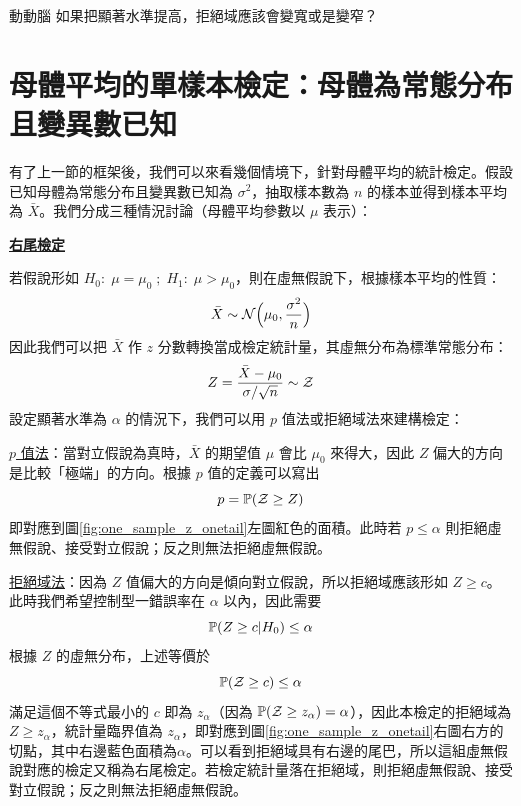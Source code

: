     \begin{custom}{動動腦}
       如果把顯著水準提高，拒絕域應該會變寬或是變窄？
    \end{custom}

    \answerbox{120pt}

\section{母體平均的單樣本檢定：母體為常態分布且變異數已知}
    有了上一節的框架後，我們可以來看幾個情境下，針對母體平均的統計檢定。假設已知母體為常態分布且變異數已知為 $\sigma^2$，抽取樣本數為 $n$ 的樣本並得到樣本平均為 $\bar{X}$。我們分成三種情況討論（母體平均參數以 $\mu$ 表示）：

    \medskip

    \noindent\underline{\textbf{右尾檢定}}

    若假說形如 $H_0: \; \mu = \mu_0 \; ; \; H_1: \; \mu > \mu_0$，則在虛無假說下，根據樣本平均的性質：
    \smallskip
    \[\bar{X} \sim \mathcal{N}\Big(\mu_0, \frac{\sigma^2}{n}\Big)\]
    \smallskip
    因此我們可以把 $\bar{X}$ 作 $z$ 分數轉換當成檢定統計量，其虛無分布為標準常態分布：
    \smallskip
    \[Z = \frac{\bar{X}-\mu_0}{\sigma/\sqrt{n}} \sim \mathcal{Z}\]
    \smallskip
    設定顯著水準為 $\alpha$ 的情況下，我們可以用 $p$ 值法或拒絕域法來建構檢定：

    \noindent \underline{$p$ 值法}：當對立假說為真時，$\bar{X}$ 的期望值 $\mu$ 會比 $\mu_0$ 來得大，因此 $Z$ 偏大的方向是比較「極端」的方向。根據 $p$ 值的定義可以寫出
    \smallskip
    \[p = \mathbb{P}(\mathcal{Z} \ge Z)\]
    \smallskip
    即對應到圖\ref{fig:one_sample_z_onetail}左圖紅色的面積。此時若 $p \le \alpha$ 則拒絕虛無假說、接受對立假說；反之則無法拒絕虛無假說。
    
    \noindent \underline{拒絕域法}：因為 $Z$ 值偏大的方向是傾向對立假說，所以拒絕域應該形如 $Z \ge c$。此時我們希望控制型一錯誤率在 $\alpha$ 以內，因此需要
    \smallskip
    \[\mathbb{P}(Z \ge c|H_0) \le \alpha\]
    \smallskip
    根據 $Z$ 的虛無分布，上述等價於
    \smallskip
    \[\mathbb{P}(\mathcal{Z} \ge c) \le \alpha\]
    \smallskip
    滿足這個不等式最小的 $c$ 即為 $z_\alpha$（因為 $\mathbb{P}(\mathcal{Z} \ge z_\alpha) = \alpha$），因此本檢定的拒絕域為 $Z \ge z_\alpha$，統計量臨界值為 $z_\alpha$，即對應到圖\ref{fig:one_sample_z_onetail}右圖右方的切點，其中右邊藍色面積為$\alpha$。可以看到拒絕域具有右邊的尾巴，所以這組虛無假說對應的檢定又稱為右尾檢定。若檢定統計量落在拒絕域，則拒絕虛無假說、接受對立假說；反之則無法拒絕虛無假說。

    \bigskip

